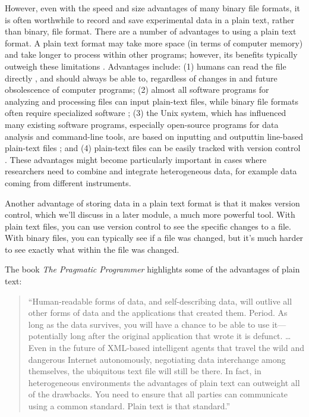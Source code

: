 \documentclass[]{tufte-book}
\begin{document}
However, even with the speed and size advantages of many binary file formats, it
is often worthwhile to record and save experimental data in a plain text, rather
than binary, file format. There are a number of advantages to using a plain text
format. A plain text format may take more space (in terms of computer memory)
and take longer to process within other programs; however, its benefits
typically outweigh these limitations \citep{hunt2000pragmatic}. Advantages include:
(1) humans can read the file directly \citep{hunt2000pragmatic, janssens2014data},
and should always be able to, regardless of changes in and future obsolescence
of computer programs; (2) almost all software programs for analyzing and
processing files can input plain-text files, while binary file formats often
require specialized software \citep{murrell2009introduction}; (3) the
Unix system, which has influenced many existing software programs, especially
open-source programs for data analysis and command-line tools, are based on
inputting and outputtin line-based plain-text files \citep{janssens2014data}; and (4)
plain-text files can be easily tracked with version control
\citep{hunt2000pragmatic}. These advantages might become particularly important in
cases where researchers need to combine and integrate heterogeneous data, for
example data coming from different instruments.

Another advantage of storing data in a plain text format is that it makes
version control, which we'll discuss in a later module, a much more powerful
tool. With plain text files, you can use version control to see the specific
changes to a file. With binary files, you can typically see if a file was
changed, but it's much harder to see exactly what within the file was changed.

The book \emph{The Pragmatic Programmer} highlights some of the advantages of plain
text:

\begin{quote}
``Human-readable forms of data, and self-describing data, will outlive all
other forms of data and the applications that created them. Period. As long as
the data survives, you will have a chance to be able to use it---potentially
long after the original application that wrote it is defunct. \ldots{} Even in the
future of XML-based intelligent agents that travel the wild and dangerous
Internet autonomously, negotiating data interchange among themselves, the
ubiquitous text file will still be there. In fact, in heterogeneous environments
the advantages of plain text can outweight all of the drawbacks. You need to
ensure that all parties can communicate using a common standard. Plain text is
that standard.'' \citep{hunt2000pragmatic}
\end{quote}
\end{document}

